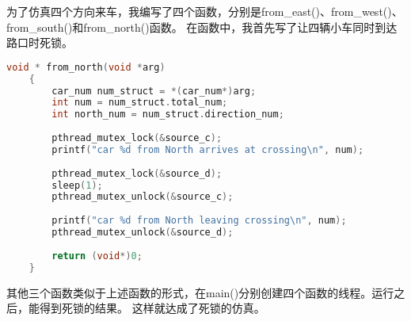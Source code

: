 \documentclass[a4paper,left=2.5cm,right=2.5cm,11pt]{article}
\begin{document}
	为了仿真四个方向来车，我编写了四个函数，分别是from\_east()、from\_west()、from\_south()和from\_north()函数。
	在函数中，我首先写了让四辆小车同时到达路口时死锁。
	\begin{lstlisting}[language = C]
	void * from_north(void *arg)
	{
		car_num num_struct = *(car_num*)arg;
		int num = num_struct.total_num;
		int north_num = num_struct.direction_num;
		
		pthread_mutex_lock(&source_c);
		printf("car %d from North arrives at crossing\n", num);
		
		pthread_mutex_lock(&source_d);
		sleep(1);
		pthread_mutex_unlock(&source_c);
		
		printf("car %d from North leaving crossing\n", num);
		pthread_mutex_unlock(&source_d);
		
		return (void*)0;
	}
	\end{lstlisting}

	其他三个函数类似于上述函数的形式，在main()分别创建四个函数的线程。运行之后，能得到死锁的结果。
	这样就达成了死锁的仿真。
\end{document}
